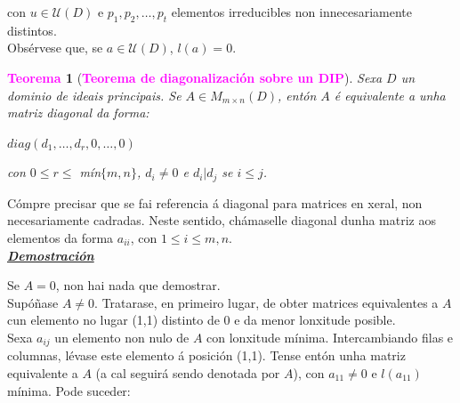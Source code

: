 \documentclass[twoside]{report}
\newcommand{\magbf}[1]{\textcolor{magenta}{\textbf{#1}}} %
\theoremstyle{mystyle}
\newtheorem{theo}{\magbf{Teorema}}[chapter]
\newenvironment{theorem}
{\begin{mdframed}[linecolor = magenta,backgroundcolor = classicrose, linewidth = 2mm]\begin{theo}}
{\end{theo}\end{mdframed}}
\begin{document}
\noindent con $u \in \mathcal{U}(D)$ e $p_{1}, p_{2}, \dots, p_{t}$ elementos irreducibles non innecesariamente distintos.\\

\noindent Obsérvese que, se $a \in \mathcal{U}(D)$, $l(a) = 0$.\\

\begin{theorem}[\magbf{Teorema de diagonalización sobre un DIP}] \label{th4.1}
Sexa $D$ un dominio de ideais principais. Se $A \in M_{m \times n}(D)$, entón $A$ é equivalente a unha matriz diagonal da forma:
\begin{center}
    $diag(d_{1}, \dots, d_{r}, 0, \dots, 0)$ 
\end{center} 
con $0 \leq r \leq$ mín$\{m,n\}$, $d_{i} \neq 0$ e $d_{i} | d_{j}$ se $i \leq j$.
\end{theorem}

\vspace{2mm}

\noindent Cómpre precisar que se fai referencia á diagonal para matrices en xeral, non necesariamente cadradas. Neste sentido, chámaselle diagonal dunha matriz aos elementos da forma $a_{ii}$, con $1 \leq i \leq m,n$.\\

\noindent \textbf{\textit{\underline{Demostración}}}

\vspace{2mm}

\noindent Se $A = 0$, non hai nada que demostrar.\\

\noindent Supóñase $A \neq 0$. Tratarase, en primeiro lugar, de obter matrices equivalentes a $A$ cun elemento no lugar (1,1) distinto de 0 e da menor lonxitude posible.\\

\noindent Sexa $a_{ij}$ un elemento non nulo de $A$ con lonxitude mínima. Intercambiando filas e columnas, lévase este elemento á posición (1,1). Tense entón unha matriz equivalente a $A$ (a cal seguirá sendo denotada por $A$), con $a_{11} \neq 0$ e $l(a_{11})$ mínima. Pode suceder:\\

\renewcommand{\theenumi}{\arabic{enumi}}
\renewcommand{\labelenumi}{\theenumi.}
\end{document}
